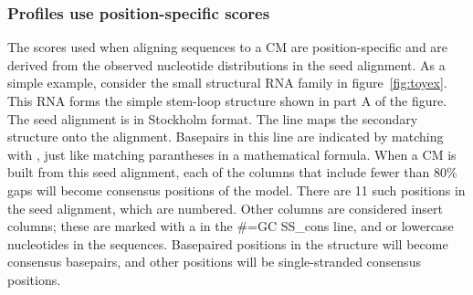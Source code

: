 
\subsubsection{Profiles use position-specific scores}

The scores used when aligning sequences to a CM are position-specific
and are derived from the observed nucleotide distributions in the seed
alignment. As a simple example, consider the small structural RNA
family in figure~\ref{fig:toyex}. This RNA forms the simple stem-loop
structure shown in part A of the figure. The seed alignment is in
Stockholm format. The  line maps the secondary
structure onto the alignment. Basepairs in this line are indicated by
matching \prog{<} with \prog{>}, just like matching parantheses in a mathematical
formula. When a CM is built from this seed alignment, each of the
columns that include fewer than 80\% gaps will become consensus
positions of the model. There are 11 such positions in the seed
alignment, which are numbered. Other columns are considered insert columns;
these are marked with a  in the {\#=GC SS\_cons} line, and
 or lowercase nucleotides in the sequences. Basepaired
positions in the structure will become consensus basepairs, and other
positions will be single-stranded consensus positions. 

